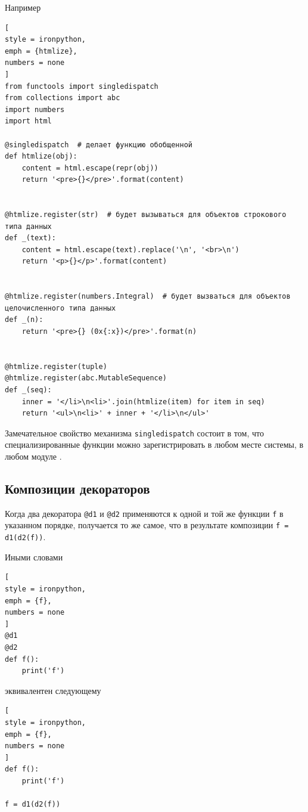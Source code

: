 \documentclass[%
	11pt,
	a4paper,
	utf8,
		]{article}
\begin{document}
Например

\begin{lstlisting}[
style = ironpython,
emph = {htmlize},
numbers = none
]
from functools import singledispatch
from collections import abc
import numbers
import html

@singledispatch  # делает функцию обобщенной
def htmlize(obj):
    content = html.escape(repr(obj))
    return '<pre>{}</pre>'.format(content)
    
    
@htmlize.register(str)  # будет вызываться для объектов строкового типа данных
def _(text):
    content = html.escape(text).replace('\n', '<br>\n')
    return '<p>{}</p>'.format(content)
    
    
@htmlize.register(numbers.Integral)  # будет вызваться для объектов целочисленного типа данных
def _(n):
    return '<pre>{} (0x{:x})</pre>'.format(n)
    
    
@htmlize.register(tuple)
@htmlize.register(abc.MutableSequence)
def _(seq):
    inner = '</li>\n<li>'.join(htmlize(item) for item in seq)
    return '<ul>\n<li>' + inner + '</li>\n</ul>'
\end{lstlisting}


Замечательное свойство механизма \texttt{singledispatch} состоит в том, что специализированные функции можно зарегистрировать в любом месте системы, в любом модуле \cite{ramalho:python-2016}.

\subsection{Композиции декораторов}

Когда два декоратора \texttt{@d1} и \texttt{@d2} применяются к одной и той же функции \texttt{f} в указанном порядке, получается то же самое, что в результате композиции \texttt{f = d1(d2(f))}.

Иными словами

\begin{lstlisting}[
style = ironpython,
emph = {f},
numbers = none
]
@d1
@d2
def f():
    print('f')
\end{lstlisting}
эквивалентен следующему
\begin{lstlisting}[
style = ironpython,
emph = {f},
numbers = none
]
def f():
    print('f')
    
f = d1(d2(f))
\end{lstlisting}
\end{document}
